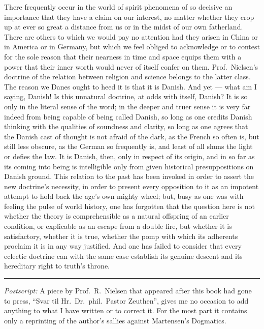 \documentclass[12pt,a4paper]{book}
\newcommand{\opage}[1]{\marginnote{\footnotesize\textit{[#1]}}}
\begin{document}
There frequently occur in the world of spirit phenomena of so decisive an
importance that they have a claim on our interest, no matter whether they crop
up at ever so great a distance from us or in the midst of our own
\opage{75}fatherland. There are others to which we would pay no attention had
they arisen in China or in America or in Germany, but which we feel obliged to
acknowledge or to contest for the sole reason that their nearness in time and
space equips them with a power that their inner worth would never of itself
confer on them. Prof.\ Nielsen's doctrine of the relation between religion and
science belongs to the latter class. The reason we Danes ought to heed it is
that it is Danish. And yet --- what am I saying, Danish! Is this unnatural
doctrine, at odds with itself, Danish? It is so only in the literal sense of
the word; in the deeper and truer sense it is very far indeed from being
capable of being called Danish, so long as one credits Danish thinking with the
qualities of soundness and clarity, so long as one agrees that the Danish cast
of thought is not afraid of the dark, as the French so often is, but still less
obscure, as the German so frequently is, and least of all shuns the light or
defies the law. It is Danish, then, only in respect of its origin, and in so far
as its coming into being is intelligible only from given historical
presuppositions on Danish ground. This relation to the past has been invoked in
order to assert the new doctrine's necessity, in order to present every
opposition to it as an impotent attempt to hold back the age's own mighty
wheel; but, busy as one was with feeling the pulse of world history, one has
forgotten that the question here is not
\opage{76}whether the theory is comprehensible as a natural offspring of an
earlier condition, or explicable as an escape from a double fire, but whether
it is satisfactory, whether it is true, whether the pomp with which its
adherents proclaim it is in any way justified. And one has failed to consider
that every eclectic doctrine can with the same ease establish its genuine
descent and its hereditary right to truth's throne.

\begin{center}
\rule{0.16\textwidth}{0.4pt}
\end{center}

\emph{Postscript:} A piece by Prof.\ R.\ Nielsen that appeared after this book
had gone to press, ``Svar til Hr.\ Dr.\ phil.\ Pastor Zeuthen'', gives me no
occasion to add anything to what I have written or to correct it. For the most
part it contains only a reprinting of the author's sallies against Martensen's
Dogmatics.
\end{document}
